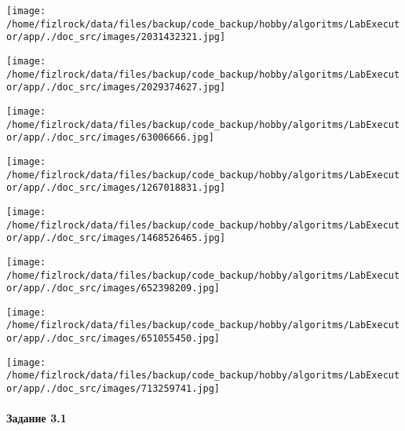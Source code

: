 \documentclass[a4paper, 12pt]{article}
\begin{document}
\texttt{[image: /home/fizlrock/data/files/backup/code\_backup/hobby/algoritms/LabExecutor/app/./doc\_src/images/2031432321.jpg]}

\texttt{[image: /home/fizlrock/data/files/backup/code\_backup/hobby/algoritms/LabExecutor/app/./doc\_src/images/2029374627.jpg]}

\texttt{[image: /home/fizlrock/data/files/backup/code\_backup/hobby/algoritms/LabExecutor/app/./doc\_src/images/63006666.jpg]}

\texttt{[image: /home/fizlrock/data/files/backup/code\_backup/hobby/algoritms/LabExecutor/app/./doc\_src/images/1267018831.jpg]}

\texttt{[image: /home/fizlrock/data/files/backup/code\_backup/hobby/algoritms/LabExecutor/app/./doc\_src/images/1468526465.jpg]}

\texttt{[image: /home/fizlrock/data/files/backup/code\_backup/hobby/algoritms/LabExecutor/app/./doc\_src/images/652398209.jpg]}

\texttt{[image: /home/fizlrock/data/files/backup/code\_backup/hobby/algoritms/LabExecutor/app/./doc\_src/images/651055450.jpg]}

\texttt{[image: /home/fizlrock/data/files/backup/code\_backup/hobby/algoritms/LabExecutor/app/./doc\_src/images/713259741.jpg]}
\pagebreak
\paragraph{Задание 3.1}
\end{document}
